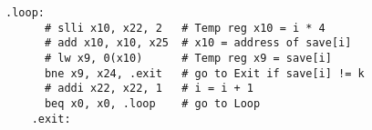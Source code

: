 \documentclass[varwidth, convert]{standalone}
\begin{document}
  \begin{BVerbatim}[gobble=4]
    .loop:
      # slli x10, x22, 2   # Temp reg x10 = i * 4
      # add x10, x10, x25  # x10 = address of save[i]
      # lw x9, 0(x10)      # Temp reg x9 = save[i]
      bne x9, x24, .exit   # go to Exit if save[i] != k
      # addi x22, x22, 1   # i = i + 1
      beq x0, x0, .loop    # go to Loop
    .exit:
  \end{BVerbatim}
\end{document}
